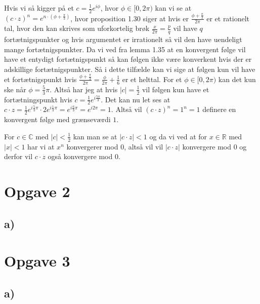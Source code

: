 \documentclass{article}
\newcommand{\m}[1]{\mathbb{#1}}
\newcommand{\mC}{\m{C}}
\newcommand{\mR}{\m{R}}
\begin{document}
Hvis vi så kigger på et $c = \frac{1}{2} e^{i\phi}$, hvor $\phi \in [ 0,2\pi )$ kan vi se at $(c \cdot z)^n = e^{n\cdot (\phi + \frac{\pi}{3})}$, hvor proposition 1.30 siger at
hvis er $ \frac{\phi + \frac{\pi}{3}}{2\pi}$ er et rationelt tal, hvor den kan skrives som uforkortelig brøk
$\frac{x}{2\pi} = \frac{p}{q}$ vil have $q$ fortætnigspunkter og hvis argumentet er irrationelt så vil den have uendeligt mange fortætnigspunkter.
Da vi ved fra lemma 1.35 at en konvergent følge vil have et entydigt fortætnigspunkt så kan følgen ikke være konverkent hvis der er
adskillige fortætnigspunkter. Så i dette tilfælde kan vi sige at følgen kun vil have et fortætnigspunkt hvis
$\frac{\phi + \frac{\pi}{3}}{2\pi} = \frac{\phi}{2\pi} + \frac{1}{6}$ er et helttal. For et $\phi \in [0, 2\pi)$ kan det kun ske når 
$\phi = \frac{5}{3}\pi$. Altså har jeg at hvis $|c| = \frac{1}{2}$ vil følgen kun have et fortætningspunkt hvis $c = \frac{1}{2}e^{i\frac{5\pi}{3}}$.
Det kan nu let ses at $c \cdot z = \frac{1}{2}e^{i\frac{5}{3}\pi} \cdot 2 e^{i \frac{1}{3}\pi} = e^{i \frac{6}{3}\pi} = e^{i2\pi} = 1$.
Altså vil $(c \cdot z)^n = 1^n = 1$ definere en konvergent følge med grænseværdi $1$.

For $c \in \mC$ med $|c| < \frac{1}{2}$ kan man se at
$|c\cdot z| < 1$ og da vi ved at for $x \in \mR$ med $|x| < 1$ har vi at $x^n$ konvergerer mod $0$, altså vil
vil $|c \cdot z|$ konvergere mod $0$ og derfor vil $c \cdot z$ også konvergere mod $0$.

\section*{Opgave 2}
\subsection*{a)}


\section*{Opgave 3}
\subsection*{a)}
\maketitle
\end{document}
